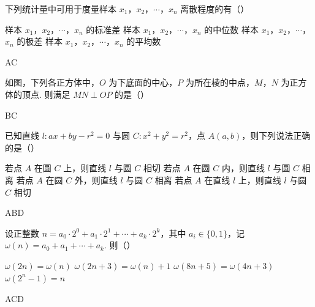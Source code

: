 \begin{problem}
下列统计量中可用于度量样本 \(x_1\)，\(x_2\)，\(\cdots\)，\(x_n\) 离散程度的有（\quad）

\choices
    {样本 \(x_1\)，\(x_2\)，\(\cdots\)，\(x_n\) 的标准差}
    {样本 \(x_1\)，\(x_2\)，\(\cdots\)，\(x_n\) 的中位数}
    {样本 \(x_1\)，\(x_2\)，\(\cdots\)，\(x_n\) 的极差}
    {样本 \(x_1\)，\(x_2\)，\(\cdots\)，\(x_n\) 的平均数}

\begin{answer}
AC
\end{answer}
\end{problem}


\begin{problem}
如图，下列各正方体中，\(O\) 为下底面的中心，\(P\) 为所在棱的中点，\(M\)，\(N\) 为正方体的顶点. 则满足 \(MN\perp OP\) 的是（\quad）

    {}
    {}
    {}

\begin{answer}
BC
\end{answer}
\end{problem}


\begin{problem}
已知直线 \(l:ax+by-r^2=0\) 与圆 \(C:x^2+y^2=r^2\)，点 \(A\left( a,b \right)\)，则下列说法正确的是（\quad）

\choices
    {若点 \(A\) 在圆 \(C\) 上，则直线 \(l\) 与圆 \(C\) 相切}
    {若点 \(A\) 在圆 \(C\) 内，则直线 \(l\) 与圆 \(C\) 相离}
    {若点 \(A\) 在圆 \(C\) 外，则直线 \(l\) 与圆 \(C\) 相离}
    {若点 \(A\) 在直线 \(l\) 上，则直线 \(l\) 与圆 \(C\) 相切}

\begin{answer}
ABD
\end{answer}
\end{problem}


\begin{problem}
设正整数 \(n=a_0\cdot 2^0+a_1\cdot 2^1+\cdots +a_k\cdot 2^k\)，其中 \(a_i\in \{0,1\}\)，记 \(\omega\left( n \right)=a_0+a_1+\cdots +a_k\). 则（\quad）

\choices
    {\(\omega\left( 2n \right)=\omega\left( n \right)\)}
    {\(\omega\left( 2n+3 \right)=\omega\left( n \right)+1\)}
    {\(\omega\left( 8n+5 \right)=\omega\left( 4n+3 \right)\)}
    {\(\omega\left( 2^n-1 \right)=n\)}

\begin{answer}
ACD
\end{answer}
\end{problem}

